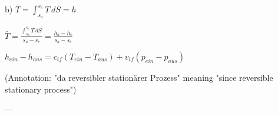 b) \( \bar{T} = \int_{s_a}^{s_e} T \, dS = h \)  

\( \bar{T} = \frac{\int_{s_a}^{s_e} T \, dS}{s_a - s_e} = \frac{h_a - h_e}{s_a - s_e} \)  

\( h_{ein} - h_{aus} = c_{if} (T_{ein} - T_{aus}) + v_{if} (p_{ein} - p_{aus}) \)  

(Annotation: "da reversibler stationärer Prozess" meaning "since reversible stationary process")  

---